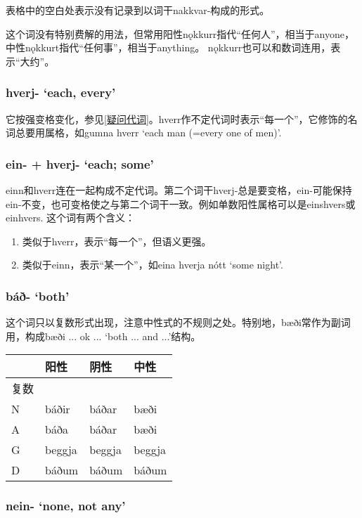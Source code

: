 \begin{introduction}[章节要点]
表格中的空白处表示没有记录到以词干nakkvar-构成的形式。

这个词没有特别费解的用法，但常用阳性nǫkkurr指代“任何人”，相当于anyone，中性nǫkkurt指代“任何事”，相当于anything。 nǫkkurr也可以和数词连用，表示“大约”。

\subsubsection{hverj- `each, every‌'}

它按强变格变化，参见\ref{疑问代词}。hverr作不定代词时表示``每一个''，它修饰的名词总要用属格，如gumna hverr `each man (=every one of men)'.

\subsubsection{ein- + hverj- `each; some‌'}

einn和hverr连在一起构成不定代词。第二个词干hverj-总是要变格，ein-可能保持ein-不变，也可变格使之与第二个词干一致。例如单数阳性属格可以是einshvers或einhvers. 这个词有两个含义：

\begin{enumerate}
    \item
          类似于hverr，表示``每一个''，但语义更强。
    \item
          类似于einn，表示``某一个''，如eina hverja nótt `some night'.
\end{enumerate}

\subsubsection{báð- `both‌'}
这个词只以复数形式出现，注意中性式的不规则之处。特别地，bæði常作为副词用，构成bæði ... ok ... `both ... and ...'结构。

\begin{longtable}{llll}
    \toprule
         & 阳性   & 阴性   & 中性   \\
    \midrule
    \endhead
    \bottomrule
    \endfoot
    复数 &        &        &        \\
    N    & báðir  & báðar  & bæði   \\
    A    & báða   & báðar  & bæði   \\
    G    & beggja & beggja & beggja \\
    D    & báðum  & báðum  & báðum  \\
\end{longtable}

\subsubsection{nein- `none, not any‌'}


\end{introduction}
